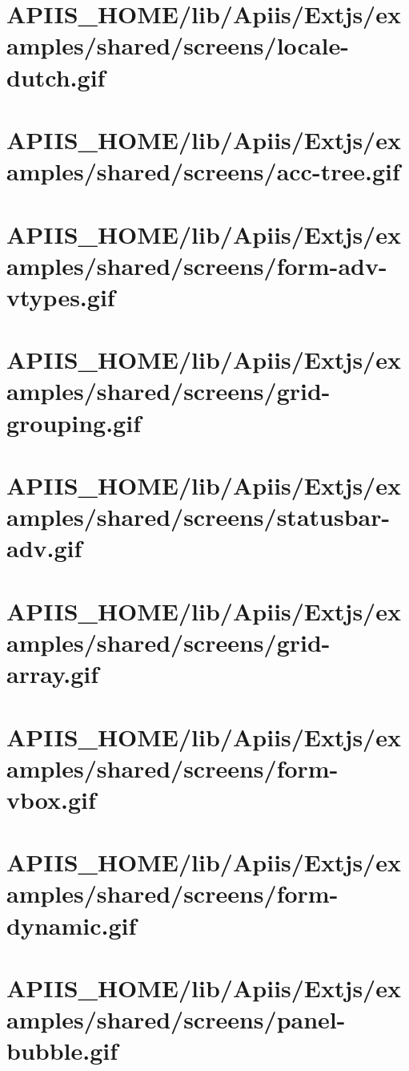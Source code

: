 \section{APIIS\_HOME/lib/Apiis/Extjs/examples/shared/screens/locale-dutch.gif} 
\section{APIIS\_HOME/lib/Apiis/Extjs/examples/shared/screens/acc-tree.gif} 
\section{APIIS\_HOME/lib/Apiis/Extjs/examples/shared/screens/form-adv-vtypes.gif} 
\section{APIIS\_HOME/lib/Apiis/Extjs/examples/shared/screens/grid-grouping.gif} 
\section{APIIS\_HOME/lib/Apiis/Extjs/examples/shared/screens/statusbar-adv.gif} 
\section{APIIS\_HOME/lib/Apiis/Extjs/examples/shared/screens/grid-array.gif} 
\section{APIIS\_HOME/lib/Apiis/Extjs/examples/shared/screens/form-vbox.gif} 
\section{APIIS\_HOME/lib/Apiis/Extjs/examples/shared/screens/form-dynamic.gif} 
\section{APIIS\_HOME/lib/Apiis/Extjs/examples/shared/screens/panel-bubble.gif} 
